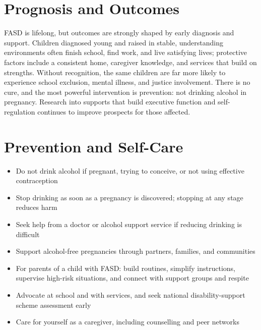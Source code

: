 \section*{Prognosis and Outcomes}
FASD is lifelong, but outcomes are strongly shaped by early diagnosis and support. Children diagnosed young and raised in stable, understanding environments often finish school, find work, and live satisfying lives; protective factors include a consistent home, caregiver knowledge, and services that build on strengths. Without recognition, the same children are far more likely to experience school exclusion, mental illness, and justice involvement. There is no cure, and the most powerful intervention is prevention: not drinking alcohol in pregnancy. Research into supports that build executive function and self-regulation continues to improve prospects for those affected.

\section*{Prevention and Self-Care}
\begin{itemize}
    \item Do not drink alcohol if pregnant, trying to conceive, or not using effective contraception
    \item Stop drinking as soon as a pregnancy is discovered; stopping at any stage reduces harm
    \item Seek help from a doctor or alcohol support service if reducing drinking is difficult
    \item Support alcohol-free pregnancies through partners, families, and communities
    \item For parents of a child with FASD: build routines, simplify instructions, supervise high-risk situations, and connect with support groups and respite
    \item Advocate at school and with services, and seek national disability-support scheme assessment early
    \item Care for yourself as a caregiver, including counselling and peer networks
\end{itemize}

